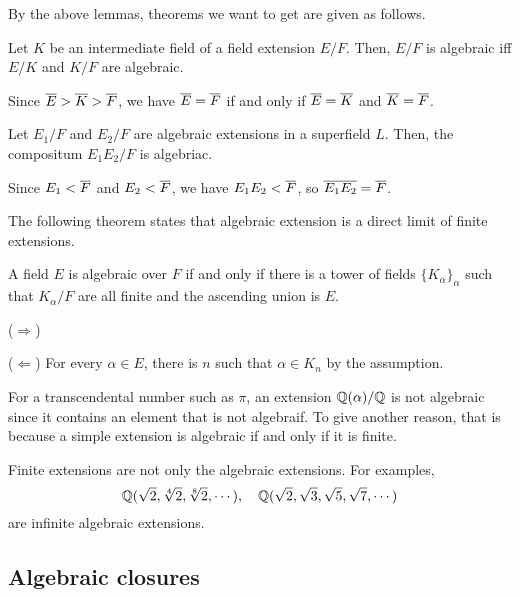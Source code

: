 \documentclass{../exp}
\begin{document}
By the above lemmas, theorems we want to get are given as follows.

\begin{thm}
Let $K$ be an intermediate field of a field extension $E/F$.
Then, $E/F$ is algebraic iff $E/K$ and $K/F$ are algebraic.
\end{thm}
\begin{pf}[1]
Since $\overline E>\overline K>\overline F$, we have $\overline E=\overline F$ if and only if $\overline E=\overline K$ and $\overline K=\overline F$.
\end{pf}
\begin{thm}
Let $E_1/F$ and $E_2/F$ are algebraic extensions in a superfield $L$.
Then, the compositum $E_1E_2/F$ is algebriac.
\end{thm}
\begin{pf}
Since $E_1<\overline F$ and $E_2<\overline F$, we have $E_1E_2<\overline F$, so $\overline{E_1E_2}=\overline{F}$.
\end{pf}

The following theorem states that algebraic extension is a direct limit of finite extensions.
\begin{thm}
A field $E$ is algebraic over $F$ if and only if there is a tower of fields $\{K_\alpha\}_\alpha$ such that $K_\alpha/F$ are all finite and the ascending union is $E$.
\end{thm}
\begin{pf}
($\Rightarrow$)

($\Leftarrow$)
For every $\alpha\in E$, there is $n$ such that $\alpha\in K_n$ by the assumption.
\end{pf}



\begin{ex}
For a transcendental number such as $\pi$, an extension $\mathbb{Q}(\alpha)/\mathbb{Q}$ is not algebraic since it contains an element that is not algebraif.
To give another reason, that is because a simple extension is algebraic if and only if it is finite.
\end{ex}
\begin{ex}
Finite extensions are not only the algebraic extensions.
For examples,
\[\mathbb{Q}(\sqrt2,\sqrt[4]2,\sqrt[8]2,\cdots),\quad\mathbb{Q}(\sqrt2,\sqrt3,\sqrt5,\sqrt7,\cdots)\]
are infinite algebraic extensions.
\end{ex}








\subsection{Algebraic closures}
\end{document}
